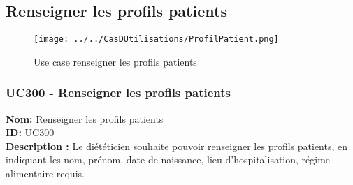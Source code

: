 \subsection{Renseigner les 
profils patients}\label{diagramme-renseigner-les-profils-patients}

\begin{figure}
\centering
\texttt{[image: ../../CasDUtilisations/ProfilPatient.png]}
\caption{Use case renseigner les profils patients}
\end{figure}

\subsubsection{UC300 - Renseigner les profils patients}\label{uc300---renseigner-les-profils-patients}

\noindent\textbf{Nom:} Renseigner les profils patients\\
\textbf{ID:} UC300\\
\textbf{Description :} Le diététicien souhaite pouvoir renseigner les
profils patients, en indiquant les nom, prénom, date de naissance, lieu d'hospitalisation,
régime alimentaire requis.\\
